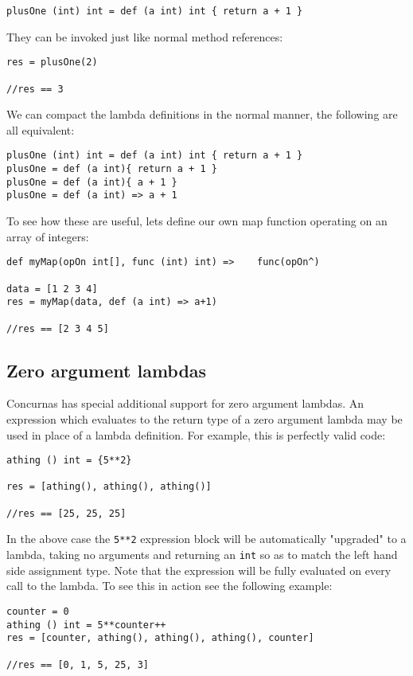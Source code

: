 \documentclass[conc-doc]{subfiles}
\begin{document}
\begin{lstlisting}
plusOne (int) int = def (a int) int { return a + 1 }
\end{lstlisting}

They can be invoked just like normal method references:
\begin{lstlisting}
res = plusOne(2)

//res == 3
\end{lstlisting}


We can compact the lambda definitions in the normal manner, the following are all equivalent:
\begin{lstlisting}
plusOne (int) int = def (a int) int { return a + 1 }
plusOne = def (a int){ return a + 1 }
plusOne = def (a int){ a + 1 }
plusOne = def (a int) => a + 1
\end{lstlisting}

To see how these are useful, lets define our own map function operating on an array of integers:
\begin{lstlisting}
def myMap(opOn int[], func (int) int) => 	func(opOn^)

data = [1 2 3 4]
res = myMap(data, def (a int) => a+1)

//res == [2 3 4 5]
\end{lstlisting}

\subsection{Zero argument lambdas}
Concurnas has special additional support for zero argument lambdas. An expression which evaluates to the return type of a zero argument lambda may be used in place of a lambda definition. For example, this is perfectly valid code:

\begin{lstlisting}
athing () int = {5**2}

res = [athing(), athing(), athing()]

//res == [25, 25, 25]
\end{lstlisting}

In the above case the \lstinline{5**2} expression block will be automatically "upgraded" to a lambda, taking no arguments and returning an \lstinline{int} so as to match the left hand side assignment type. Note that the expression will be fully evaluated on every call to the lambda. To see this in action see the following example:

\begin{lstlisting}
counter = 0
athing () int = 5**counter++	
res = [counter, athing(), athing(), athing(), counter]

//res == [0, 1, 5, 25, 3]
\end{lstlisting}
\end{document}

